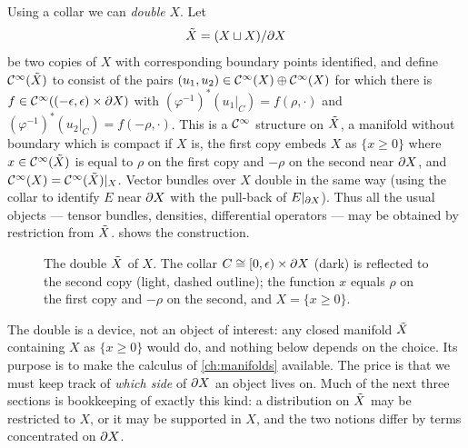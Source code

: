 Using a collar we can \emph{double} $X$. Let
\begin{equation*}
\tilde{X}=(X\sqcup X)/\partial X
\end{equation*}
be two copies of $X$ with corresponding boundary points identified, and define
$\mathcal{C}^\infty(\tilde{X})$ to consist of the pairs $(u_1,u_2)\in\mathcal{C}^\infty(X)\oplus\mathcal{C}^\infty(X)$ for which there
is $f\in\mathcal{C}^\infty((-\epsilon,\epsilon)\times\partial X)$ with $(\varphi^{-1})^*(u_1|_C)=
f(\rho,\cdot)$ and $(\varphi^{-1})^*(u_2|_C)=f(-\rho,\cdot)$. This is a $\mathcal{C}^\infty$ structure
on $\tilde{X}$, a manifold without boundary which is compact if $X$ is, the first copy
embeds $X$ as $\{x\ge0\}$ where $x\in\mathcal{C}^\infty(\tilde{X})$ is equal to $\rho$ on the first copy
and $-\rho$ on the second near $\partial X$, and $\mathcal{C}^\infty(X)=\mathcal{C}^\infty(\tilde{X})|_X$. Vector bundles over
$X$ double in the same way (using the collar to identify $E$ near $\partial X$ with the
pull-back of $E|_{\partial X}$). Thus all the usual objects --- tensor bundles, densities,
differential operators --- may be obtained by restriction from $\tilde{X}$.
 shows the construction.

\begin{figure}[ht]
  \centering
  \caption{The double $\tilde{X}$ of $X$. The collar $C\cong[0,\epsilon)\times\partial X$
  (dark) is reflected to the second copy (light, dashed outline); the function $x$
  equals $\rho$ on the first copy and $-\rho$ on the second, and $X=\{x\ge0\}$.}
  \label{boundary:fig:double}
\end{figure}

\begin{discussion}
The double is a device, not an object of interest: any closed manifold $\tilde{X}$
containing $X$ as $\{x\ge0\}$ would do, and nothing below depends on the choice. Its
purpose is to make the calculus of \cref{ch:manifolds} available. The price is that
we must keep track of \emph{which side} of $\partial X$ an object lives on. Much of the
next three sections is bookkeeping of exactly this kind: a distribution on $\tilde{X}$ may
be restricted to $X$, or it may be supported in $X$, and the two notions differ by
terms concentrated on $\partial X$.
\end{discussion}

